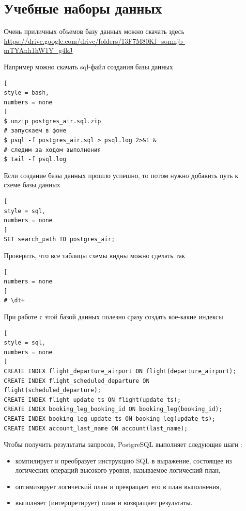 \documentclass[%
	11pt,
	a4paper,
	utf8,
		]{article}
\begin{document}
\section{Учебные наборы данных}

Очень приличных объемов базу данных можно скачать здесь \url{https://drive.google.com/drive/folders/13F7M80Kf_somnjb-mTYAnh1hW1Y_g4kJ}

Например можно скачать sql-файл создания базы данных
\begin{lstlisting}[
style = bash,
numbers = none
]
$ unzip postgres_air.sql.zip
# запускаем в фоне
$ psql -f postgres_air.sql > psql.log 2>&1 &
# следим за ходом выполнения 
$ tail -f psql.log
\end{lstlisting}

Если создание базы данных прошло успешно, то потом нужно добавить путь к схеме базы данных
\begin{lstlisting}[
style = sql,
numbers = none
]
SET search_path TO postgres_air;
\end{lstlisting}

Проверить, что все таблицы схемы видны можно сделать так
\begin{lstlisting}[
numbers = none
]
# \dt+
\end{lstlisting}

При работе с этой базой данных полезно сразу создать кое-какие индексы
\begin{lstlisting}[
style = sql,
numbers = none
]
CREATE INDEX flight_departure_airport ON flight(departure_airport);
CREATE INDEX flight_scheduled_departure ON flight(scheduled_departure);
CREATE INDEX flight_update_ts ON flight(update_ts);
CREATE INDEX booking_leg_booking_id ON booking_leg(booking_id);
CREATE INDEX booking_leg_update_ts ON booking_leg(update_ts);
CREATE INDEX account_last_name ON account(last_name);
\end{lstlisting}

Чтобы получить результаты запросов, PostgreSQL выполняет следующие шаги \cite[]{dombrovskaya:postgresql-2022}:
\begin{itemize}
	\item компилирует и преобразует инструкцию SQL в выражение, состоящее из логических операций высокого уровня, называемое логический план,
	
	\item оптимизирует логический план и превращает его в план выполнения,
	
	\item выполняет (интерпретирует) план и возвращает результаты.
\end{itemize}
\end{document}
